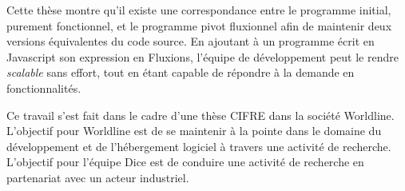 Cette thèse montre qu'il existe une correspondance entre le programme initial, purement fonctionnel, et le programme pivot fluxionnel afin de maintenir deux versions équivalentes du code source.
En ajoutant à un programme écrit en Javascript son expression en Fluxions, l'équipe de développement peut le rendre \textit{scalable} sans effort, tout en étant capable de répondre à la demande en fonctionnalités.

Ce travail s'est fait dans le cadre d'une thèse CIFRE dans la société Worldline.
L'objectif pour Worldline est de se maintenir à la pointe dans le domaine du développement et de l'hébergement logiciel à travers une activité de recherche.
L'objectif pour l'équipe Dice est de conduire une activité de recherche en partenariat avec un acteur industriel.